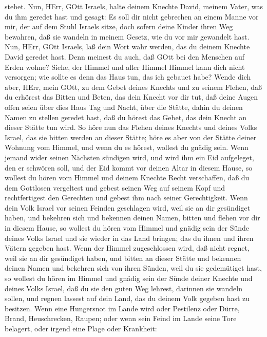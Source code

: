 stehet.  Nun, HErr, GOtt Israels, halte deinem Knechte
David, meinem Vater, was du ihm geredet hast und gesagt: Es soll dir
nicht gebrechen an einem Manne vor mir, der auf dem Stuhl Israels sitze,
doch sofern deine Kinder ihren Weg bewahren, daß sie wandeln in meinem
Gesetz, wie du vor mir gewandelt hast.  Nun, HErr, GOtt
Israels, laß dein Wort wahr werden, das du deinem Knechte David geredet
hast.  Denn meinest du auch, daß GOtt bei den Menschen auf
Erden wohne? Siehe, der Himmel und aller Himmel Himmel kann dich nicht
versorgen; wie sollte es denn das Haus tun, das ich gebauet habe?
 Wende dich aber, HErr, mein GOtt, zu dem Gebet deines
Knechts und zu seinem Flehen, daß du erhörest das Bitten und Beten, das
dein Knecht vor dir tut,  daß deine Augen offen seien über
dies Haus Tag und Nacht, über die Stätte, dahin du deinen Namen zu
stellen geredet hast, daß du hörest das Gebet, das dein Knecht an dieser
Stätte tun wird.  So höre nun das Flehen deines Knechts und
deines Volks Israel, das sie bitten werden an dieser Stätte; höre es
aber von der Stätte deiner Wohnung vom Himmel, und wenn du es hörest,
wollest du gnädig sein.  Wenn jemand wider seinen Nächsten
sündigen wird, und wird ihm ein Eid aufgeleget, den er schwören soll,
und der Eid kommt vor deinen Altar in diesem Hause,  so
wollest du hören vom Himmel und deinem Knechte Recht verschaffen, daß du
dem Gottlosen vergeltest und gebest seinen Weg auf seinem Kopf und
rechtfertigest den Gerechten und gebest ihm nach seiner Gerechtigkeit.
 Wenn dein Volk Israel vor seinen Feinden geschlagen wird,
weil sie an dir gesündiget haben, und bekehren sich und bekennen deinen
Namen, bitten und flehen vor dir in diesem Hause,  so
wollest du hören vom Himmel und gnädig sein der Sünde deines Volks
Israel und sie wieder in das Land bringen; das du ihnen und ihren Vätern
gegeben hast.  Wenn der Himmel zugeschlossen wird, daß
nicht regnet, weil sie an dir gesündiget haben, und bitten an dieser
Stätte und bekennen deinen Namen und bekehren sich von ihren Sünden,
weil du sie gedemütiget hast,  so wollest du hören im
Himmel und gnädig sein der Sünde deiner Knechte und deines Volks Israel,
daß du sie den guten Weg lehrest, darinnen sie wandeln sollen, und
regnen lassest auf dein Land, das du deinem Volk gegeben hast zu
besitzen.  Wenn eine Hungersnot im Lande wird oder
Pestilenz oder Dürre, Brand, Heuschrecken, Raupen; oder wenn sein Feind
im Lande seine Tore belagert, oder irgend eine Plage oder Krankheit:
